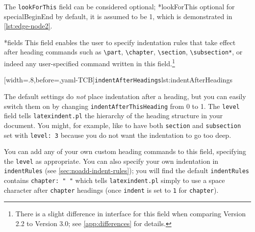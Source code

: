  The \texttt{lookForThis} field can be considered optional;
 *{lookForThis optional for specialBeginEnd} by default, it is
 assumed to be 1, which is demonstrated in \cref{lst:edge-node2}.%

*{fields}
 This field enables the user to specify indentation rules that take effect after heading
 commands such as \lstinline!\part!, \lstinline!\chapter!, \lstinline!\section!,
 \lstinline!\subsection*!, or indeed any user-specified command written in this
 field.\footnote{There is a slight difference in interface for this field when comparing
 Version 2.2 to Version 3.0; see \vref{app:differences} for details.}

 [width=.8\linewidth,before=\centering,yaml-TCB]{\texttt{indentAfterHeadings}}{lst:indentAfterHeadings}

 The default settings do \emph{not} place indentation after a heading, but you can easily
 switch them on by changing \texttt{indentAfterThisHeading} from 0 to 1. The
 \texttt{level} field tells \texttt{latexindent.pl} the hierarchy of the heading
 structure in your document. You might, for example, like to have both \texttt{section}
 and \texttt{subsection} set with \texttt{level: 3} because you do not want the
 indentation to go too deep.

 You can add any of your own custom heading commands to this field, specifying the
 \texttt{level} as appropriate. You can also specify your own indentation in
 \texttt{indentRules} (see \vref{sec:noadd-indent-rules}); you will find the default
 \texttt{indentRules} contains \lstinline!chapter: " "! which tells
 \texttt{latexindent.pl} simply to use a space character after \texttt{chapter} headings
 (once \texttt{indent} is set to \texttt{1} for \texttt{chapter}).

